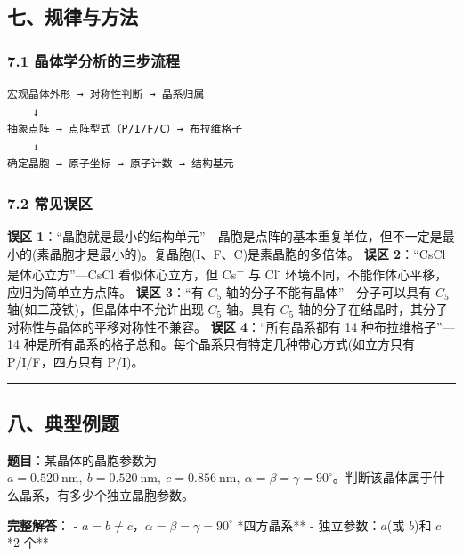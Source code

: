 \subsection{七、规律与方法}\label{ux4e03ux89c4ux5f8bux4e0eux65b9ux6cd5}

\subsubsection{7.1 晶体学分析的三步流程}\label{ux6676ux4f53ux5b66ux5206ux6790ux7684ux4e09ux6b65ux6d41ux7a0b}

\begin{verbatim}
宏观晶体外形 → 对称性判断 → 晶系归属
    ↓
抽象点阵 → 点阵型式（P/I/F/C）→ 布拉维格子
    ↓
确定晶胞 → 原子坐标 → 原子计数 → 结构基元
\end{verbatim}

\subsubsection{7.2 常见误区}\label{ux5e38ux89c1ux8befux533a}

\textbf{误区 1}：``晶胞就是最小的结构单元''---晶胞是点阵的基本重复单位，但不一定是最小的(素晶胞才是最小的)。复晶胞(I、F、C)是素晶胞的多倍体。
\textbf{误区 2}：``CsCl 是体心立方''---CsCl 看似体心立方，但 Cs\textsuperscript{+} 与 Cl\textsuperscript{-} 环境不同，不能作体心平移，应归为简单立方点阵。
\textbf{误区 3}：``有 \(C_5\) 轴的分子不能有晶体''---分子可以具有 \(C_5\) 轴(如二茂铁)，但晶体中不允许出现 \(C_5\) 轴。具有 \(C_5\) 轴的分子在结晶时，其分子对称性与晶体的平移对称性不兼容。
\textbf{误区 4}：``所有晶系都有 14 种布拉维格子''---14 种是所有晶系的格子总和。每个晶系只有特定几种带心方式(如立方只有 P/I/F，四方只有 P/I)。

\begin{center}\rule{0.5\linewidth}{0.5pt}\end{center}

\subsection{八、典型例题}\label{ux516bux5178ux578bux4f8bux9898}

\textbf{题目}：某晶体的晶胞参数为 \(a = 0.520\ \mathrm{nm},\ b = 0.520\ \mathrm{nm},\ c = 0.856\ \mathrm{nm},\ \alpha = \beta = \gamma = 90^\circ\)。判断该晶体属于什么晶系，有多少个独立晶胞参数。

\textbf{完整解答}：
- \(a = b \neq c\)，\(\alpha = \beta = \gamma = 90^\circ\) \箭 **四方晶系**
- 独立参数：\(a\)(或 \(b\))和 \(c\) \箭 **2 个**

